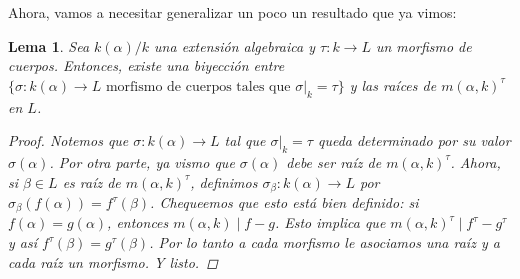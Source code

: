 \documentclass[12pt]{book}
\newtheorem{lem}[teo]{Lema}
\theoremstyle{definition}
\begin{document}
Ahora, vamos a necesitar generalizar un poco un resultado que ya vimos:

\begin{lem}
Sea $k(\alpha)/k$ una extensión algebraica y $\tau:k\to L$ un morfismo de cuerpos. Entonces, existe una biyección entre $\{\sigma:k(\alpha)\to L \text{ morfismo de cuerpos tales que }\left.\sigma\right|_{k}=\tau\}$ y las raíces de $m(\alpha,k)^\tau$ en $L$.
\begin{proof}
Notemos que $\sigma:k(\alpha)\to L$ tal que $\left.\sigma\right|_{k}=\tau$ queda determinado por su valor $\sigma(\alpha)$. Por otra parte, ya vismo que $\sigma(\alpha)$ debe ser raíz de $m(\alpha,k)^\tau$. Ahora, si $\beta\in L$ es raíz de $m(\alpha,k)^\tau$, definimos $\sigma_\beta:k(\alpha)\to L$ por $\sigma_\beta(f(\alpha)) = f^\tau(\beta)$. Chequeemos que esto está bien definido: si $f(\alpha)=g(\alpha)$, entonces $m(\alpha,k)\mid f-g$. Esto implica que $m(\alpha,k)^\tau \mid f^\tau - g^\tau$ y así $f^\tau(\beta) = g^\tau(\beta)$. Por lo tanto a cada morfismo le asociamos una raíz y a cada raíz un morfismo. Y listo.
\end{proof}
\end{lem}
\end{document}
